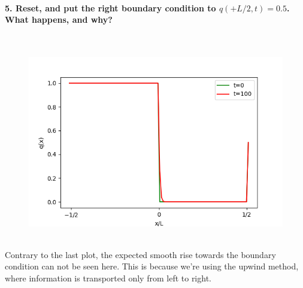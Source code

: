 \paragraph{5. Reset, and put the right boundary condition 
    to $q(+L/2,t)=0.5$. What happens, and why?
} \ \\ 
    \begin{figure}[h!]
        \centering
        \includegraphics[width=.6\textwidth]{../figures/upwind_5.png}
    \end{figure} \ \\ 
    Contrary to the last plot, the expected smooth 
    rise towards the boundary condition can not 
    be seen here.
    This is because we're using the upwind method, 
    where information is transported only from left
    to right.

